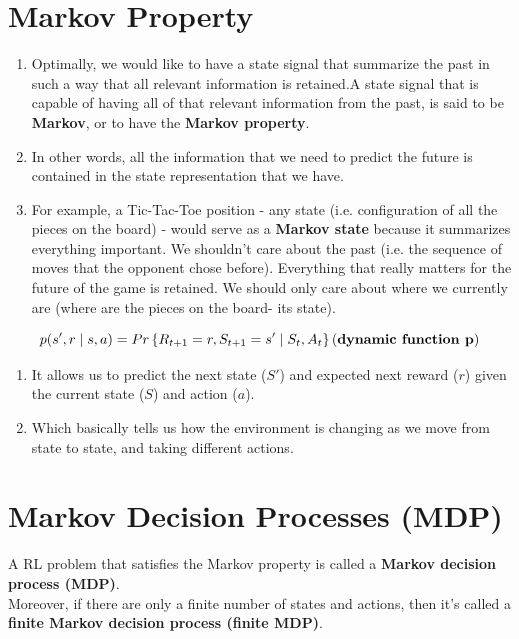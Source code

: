 \section{Markov Property \cite{medium-introduction-to-reinforcement-learning-rl-part-3-finite-markov-decision-processes-51e1f8d3ddb7}}\label{RL: Markov Property}
\begin{enumerate}
    \item Optimally, we would like to have a state signal that summarize the past in such a way that all relevant information is retained.A state signal that is capable of having all of that relevant information from the past, is said to be \textbf{Markov}, or to have the \textbf{Markov property}.
    \item In other words, all the information that we need to predict the future is contained in the state representation that we have.
    \item For example, a Tic-Tac-Toe position - any state (i.e. configuration of all the pieces on the board) - would serve as a \textbf{Markov state} because it summarizes everything important. We shouldn’t care about the past (i.e. the sequence of moves that the opponent chose before). Everything that really matters for the future of the game is retained. We should only care about where we currently are (where are the pieces on the board- its state).
\end{enumerate}

\[
    p(s',r \mid s,a) = Pr\dCurlyBrac{R_{t+1} = r, S_{t+1}=s' \mid S_t,A_t} \hfill (\text{\textbf{dynamic function p}})
\]

\begin{enumerate}
    \item It allows us to predict the next state ($S'$) and expected next reward ($r$) given the current state ($S$) and action ($a$).
    \item Which basically tells us how the environment is changing as we move from state to state, and taking different actions.
\end{enumerate}


\section{Markov Decision Processes (MDP) \cite{medium-introduction-to-reinforcement-learning-rl-part-3-finite-markov-decision-processes-51e1f8d3ddb7}}\label{RL: Markov Decision Processes (MDP)}
A RL problem that satisfies the Markov property is called a \textbf{Markov decision process (MDP)}.\\
Moreover, if there are only a finite number of states and actions, then it’s called a \textbf{finite Markov decision process (finite MDP)}.

